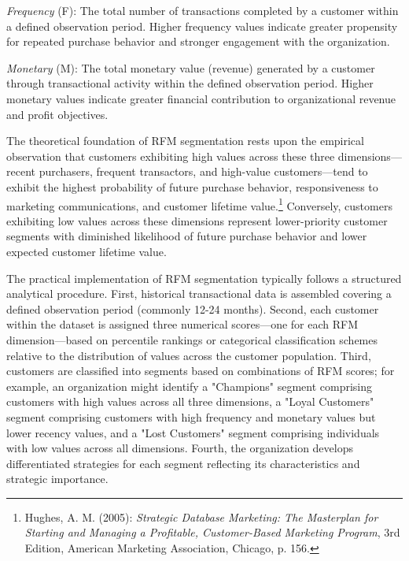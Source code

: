 \documentclass[12pt,a4paper,oneside]{report}
\begin{document}
\textit{Frequency} (F): The total number of transactions completed by a customer within a defined observation period. Higher frequency values indicate greater propensity for repeated purchase behavior and stronger engagement with the organization.

\textit{Monetary} (M): The total monetary value (revenue) generated by a customer through transactional activity within the defined observation period. Higher monetary values indicate greater financial contribution to organizational revenue and profit objectives.

The theoretical foundation of RFM segmentation rests upon the empirical observation that customers exhibiting high values across these three dimensions—recent purchasers, frequent transactors, and high-value customers—tend to exhibit the highest probability of future purchase behavior, responsiveness to marketing communications, and customer lifetime value.\footnote{Hughes, A. M. (2005): \textit{Strategic Database Marketing: The Masterplan for Starting and Managing a Profitable, Customer-Based Marketing Program}, 3rd Edition, American Marketing Association, Chicago, p. 156.} Conversely, customers exhibiting low values across these dimensions represent lower-priority customer segments with diminished likelihood of future purchase behavior and lower expected customer lifetime value.

The practical implementation of RFM segmentation typically follows a structured analytical procedure. First, historical transactional data is assembled covering a defined observation period (commonly 12-24 months). Second, each customer within the dataset is assigned three numerical scores—one for each RFM dimension—based on percentile rankings or categorical classification schemes relative to the distribution of values across the customer population. Third, customers are classified into segments based on combinations of RFM scores; for example, an organization might identify a "Champions" segment comprising customers with high values across all three dimensions, a "Loyal Customers" segment comprising customers with high frequency and monetary values but lower recency values, and a "Lost Customers" segment comprising individuals with low values across all dimensions. Fourth, the organization develops differentiated strategies for each segment reflecting its characteristics and strategic importance.
\end{document}
